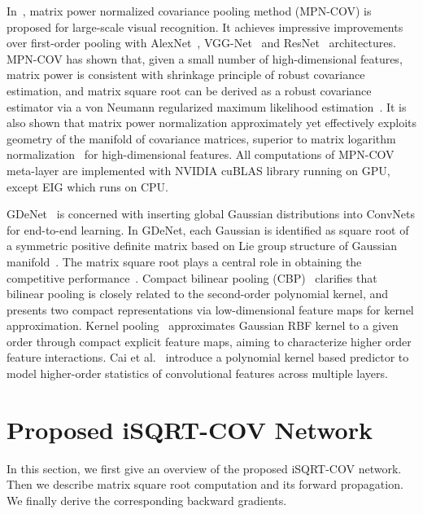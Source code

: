 \documentclass[10pt,twocolumn,letterpaper]{article}
\begin{document}
In~\cite{Li_2017_ICCV}, matrix power normalized covariance pooling method (MPN-COV) is proposed  for large-scale visual recognition. It achieves impressive  improvements over first-order pooling with  AlexNet~\cite{Krizhevsky2012ImageNet}, VGG-Net~\cite{DBLP:conf/bmvc/ChatfieldSVZ14,Simonyan15} and ResNet~\cite{He_2016_CVPR} architectures. MPN-COV has shown that,  given a small number of high-dimensional features,  matrix power is consistent with shrinkage principle of robust covariance estimation, and matrix square root can be derived as a robust covariance estimator via  a von Neumann regularized maximum likelihood estimation~\cite{Wang_2016_CVPR}. It is also shown that matrix power normalization approximately yet effectively exploits geometry of the manifold of covariance matrices, superior to matrix logarithm normalization~\cite{Ionescu_2015_ICCV} for high-dimensional  features. All computations of MPN-COV meta-layer are implemented with NVIDIA cuBLAS library running on GPU, except EIG which runs on CPU.

GDeNet~\cite{Wang_2017_CVPR} is concerned with inserting global Gaussian distributions into  ConvNets for end-to-end learning. In GDeNet, each Gaussian  is identified as square root of a symmetric positive definite matrix based on Lie group structure of Gaussian manifold~\cite{LE2MG}. The matrix square root  plays a central role in obtaining the competitive performance~\cite[Tab. 1 \& Tab. 5]{Wang_2017_CVPR}.   Compact bilinear pooling (CBP)~\cite{Gao_2016_CVPR} clarifies that bilinear pooling is closely related to the second-order polynomial kernel, and presents two compact representations via low-dimensional feature maps for kernel approximation. Kernel pooling~\cite{Cui_2017_CVPR} approximates Gaussian RBF kernel to a given order through compact explicit feature maps, aiming to characterize higher order feature interactions.  Cai et al.~\cite{Cai_2017_ICCV} introduce a polynomial kernel based predictor to model higher-order statistics of convolutional features across multiple layers. 




\section{Proposed iSQRT-COV Network}\label{section:proposed-method}

In this section, we first give an overview of the proposed iSQRT-COV network. Then we describe matrix square root computation and its forward  propagation. We finally  derive the corresponding backward gradients.
\end{document}
